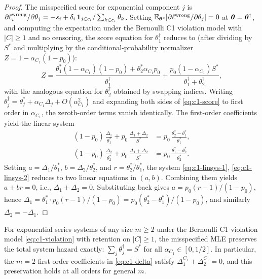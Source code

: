 \begin{proof}
The misspecified score for exponential component $j$ is
$\partial \ell_i^{\mathrm{wrong}} / \partial \theta_j = -s_i + \delta_i \,
\mathbf{1}_{j \in c_i} / \sum_{k \in c_i} \theta_k$. Setting
$\mathbb{E}_{\bm{\theta}^*}[\partial \ell^{\mathrm{wrong}} / \partial \theta_j] = 0$ at
$\bm{\theta} = \bm{\theta}^\dagger$, and computing the expectation under the
Bernoulli C1 violation model with $|C| \geq 1$ and no censoring, the score
equation for $\theta_1^\dagger$ reduces to (after dividing by $S^*$ and
multiplying by the conditional-probability normalizer
$Z = 1 - \alpha_{C_1}(1-p_0)$):
\begin{equation}
\label{eq:c1-score}
    Z =
    \frac{\theta_1^*(1-\alpha_{C_1})(1-p_0) + \theta_2^* \alpha_{C_1} p_0}
         {\theta_1^\dagger}
    + \frac{p_0 (1-\alpha_{C_1}) S^*}{\theta_1^\dagger + \theta_2^\dagger},
\end{equation}
with the analogous equation for $\theta_2^\dagger$ obtained by swapping
indices. Writing $\theta_j^\dagger = \theta_j^* + \alpha_{C_1} \Delta_j +
O(\alpha_{C_1}^2)$ and expanding both sides of \eqref{eq:c1-score} to
first order in $\alpha_{C_1}$, the zeroth-order terms vanish identically.
The first-order coefficients yield the linear system
\begin{align}
\label{eq:c1-linsys-1}
    (1-p_0)\, \frac{\Delta_1}{\theta_1^*}
        + p_0\, \frac{\Delta_1 + \Delta_2}{S^*}
        &= p_0\, \frac{\theta_2^* - \theta_1^*}{\theta_1^*}, \\
\label{eq:c1-linsys-2}
    (1-p_0)\, \frac{\Delta_2}{\theta_2^*}
        + p_0\, \frac{\Delta_1 + \Delta_2}{S^*}
        &= p_0\, \frac{\theta_1^* - \theta_2^*}{\theta_2^*}.
\end{align}
Setting $a = \Delta_1 / \theta_1^*$, $b = \Delta_2 / \theta_2^*$, and
$r = \theta_2^* / \theta_1^*$, the system \eqref{eq:c1-linsys-1},
\eqref{eq:c1-linsys-2} reduces to two linear equations in $(a, b)$.
Combining them yields $a + br = 0$, i.e., $\Delta_1 + \Delta_2 = 0$.
Substituting back gives
$a = p_0 (r-1) / (1 - p_0)$, hence
$\Delta_1 = \theta_1^* \cdot p_0 (r-1) / (1-p_0) = p_0 (\theta_2^* -
\theta_1^*) / (1-p_0)$, and similarly $\Delta_2 = -\Delta_1$.
\end{proof}

\begin{corollary}
\label{cor:c1-hazard-general}
For exponential series systems of any size $m \geq 2$ under the Bernoulli
C1 violation model \eqref{eq:c1-violation} with retention on
$|C| \geq 1$, the misspecified MLE preserves the total system hazard
exactly: $\sum_j \theta_j^\dagger = S^*$ for all
$\alpha_{C_1} \in [0, 1/2]$. In particular, the $m=2$ first-order
coefficients in \eqref{eq:c1-delta} satisfy $\Delta_1^{C_1} +
\Delta_2^{C_1} = 0$, and this preservation holds at all orders for
general $m$.
\end{corollary}


